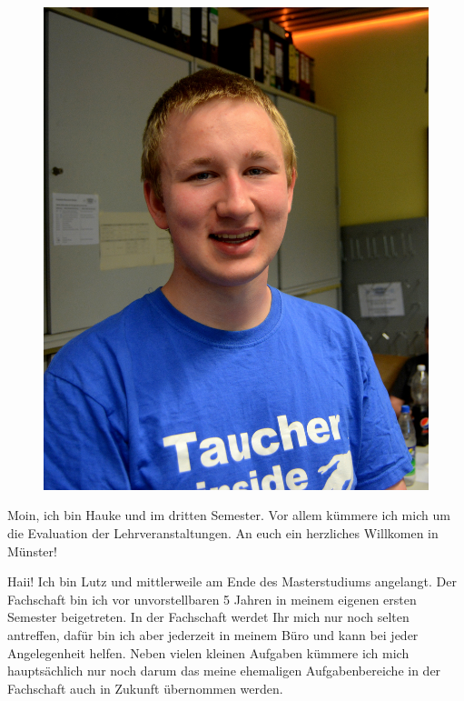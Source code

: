 \begin{multicols*}{2}
{\begin{figure}
		\includegraphics[width=\fibelstdlen]{res/vorstellungsfotos/hauke_hawighorst_cropped}
	\end{figure}
}
{Moin, ich bin Hauke und im dritten Semester. Vor allem kümmere ich mich um die Evaluation der Lehrveranstaltungen. An euch ein herzliches Willkomen in Münster!
\vspace{2\baselineskip}}

{Haii! Ich bin Lutz und mittlerweile am Ende des Masterstudiums angelangt. Der Fachschaft bin ich vor unvorstellbaren 5 Jahren in meinem eigenen ersten Semester beigetreten. In der Fachschaft werdet Ihr mich nur noch selten antreffen, dafür bin ich aber jederzeit in meinem Büro und kann bei jeder Angelegenheit helfen. Neben vielen kleinen Aufgaben kümmere ich mich hauptsächlich nur noch darum das meine ehemaligen Aufgabenbereiche in der Fachschaft auch in Zukunft übernommen werden.

}
\end{multicols*}
